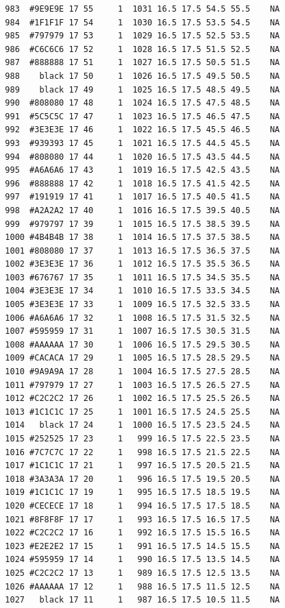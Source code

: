 \documentclass[12pt,twoside]{reedthesis}
\begin{document}
\begin{verbatim}
  983  #9E9E9E 17 55     1  1031 16.5 17.5 54.5 55.5    NA
  984  #1F1F1F 17 54     1  1030 16.5 17.5 53.5 54.5    NA
  985  #797979 17 53     1  1029 16.5 17.5 52.5 53.5    NA
  986  #C6C6C6 17 52     1  1028 16.5 17.5 51.5 52.5    NA
  987  #888888 17 51     1  1027 16.5 17.5 50.5 51.5    NA
  988    black 17 50     1  1026 16.5 17.5 49.5 50.5    NA
  989    black 17 49     1  1025 16.5 17.5 48.5 49.5    NA
  990  #808080 17 48     1  1024 16.5 17.5 47.5 48.5    NA
  991  #5C5C5C 17 47     1  1023 16.5 17.5 46.5 47.5    NA
  992  #3E3E3E 17 46     1  1022 16.5 17.5 45.5 46.5    NA
  993  #939393 17 45     1  1021 16.5 17.5 44.5 45.5    NA
  994  #808080 17 44     1  1020 16.5 17.5 43.5 44.5    NA
  995  #A6A6A6 17 43     1  1019 16.5 17.5 42.5 43.5    NA
  996  #888888 17 42     1  1018 16.5 17.5 41.5 42.5    NA
  997  #191919 17 41     1  1017 16.5 17.5 40.5 41.5    NA
  998  #A2A2A2 17 40     1  1016 16.5 17.5 39.5 40.5    NA
  999  #979797 17 39     1  1015 16.5 17.5 38.5 39.5    NA
  1000 #4B4B4B 17 38     1  1014 16.5 17.5 37.5 38.5    NA
  1001 #808080 17 37     1  1013 16.5 17.5 36.5 37.5    NA
  1002 #3E3E3E 17 36     1  1012 16.5 17.5 35.5 36.5    NA
  1003 #676767 17 35     1  1011 16.5 17.5 34.5 35.5    NA
  1004 #3E3E3E 17 34     1  1010 16.5 17.5 33.5 34.5    NA
  1005 #3E3E3E 17 33     1  1009 16.5 17.5 32.5 33.5    NA
  1006 #A6A6A6 17 32     1  1008 16.5 17.5 31.5 32.5    NA
  1007 #595959 17 31     1  1007 16.5 17.5 30.5 31.5    NA
  1008 #AAAAAA 17 30     1  1006 16.5 17.5 29.5 30.5    NA
  1009 #CACACA 17 29     1  1005 16.5 17.5 28.5 29.5    NA
  1010 #9A9A9A 17 28     1  1004 16.5 17.5 27.5 28.5    NA
  1011 #797979 17 27     1  1003 16.5 17.5 26.5 27.5    NA
  1012 #C2C2C2 17 26     1  1002 16.5 17.5 25.5 26.5    NA
  1013 #1C1C1C 17 25     1  1001 16.5 17.5 24.5 25.5    NA
  1014   black 17 24     1  1000 16.5 17.5 23.5 24.5    NA
  1015 #252525 17 23     1   999 16.5 17.5 22.5 23.5    NA
  1016 #7C7C7C 17 22     1   998 16.5 17.5 21.5 22.5    NA
  1017 #1C1C1C 17 21     1   997 16.5 17.5 20.5 21.5    NA
  1018 #3A3A3A 17 20     1   996 16.5 17.5 19.5 20.5    NA
  1019 #1C1C1C 17 19     1   995 16.5 17.5 18.5 19.5    NA
  1020 #CECECE 17 18     1   994 16.5 17.5 17.5 18.5    NA
  1021 #8F8F8F 17 17     1   993 16.5 17.5 16.5 17.5    NA
  1022 #C2C2C2 17 16     1   992 16.5 17.5 15.5 16.5    NA
  1023 #E2E2E2 17 15     1   991 16.5 17.5 14.5 15.5    NA
  1024 #595959 17 14     1   990 16.5 17.5 13.5 14.5    NA
  1025 #C2C2C2 17 13     1   989 16.5 17.5 12.5 13.5    NA
  1026 #AAAAAA 17 12     1   988 16.5 17.5 11.5 12.5    NA
  1027   black 17 11     1   987 16.5 17.5 10.5 11.5    NA

\end{verbatim}
\end{document}
